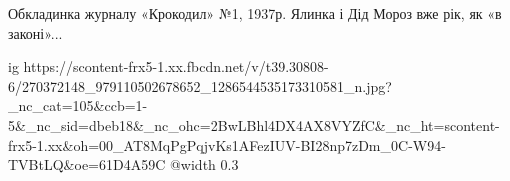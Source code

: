  
 
 
 
 
Обкладинка журналу «Крокодил» №1, 1937р. Ялинка і Дід Мороз вже рік, як «в законі»...

\ifcmt
  ig https://scontent-frx5-1.xx.fbcdn.net/v/t39.30808-6/270372148_979110502678652_1286544535173310581_n.jpg?_nc_cat=105&ccb=1-5&_nc_sid=dbeb18&_nc_ohc=2BwLBhl4DX4AX8VYZfC&_nc_ht=scontent-frx5-1.xx&oh=00_AT8MqPgPqjvKs1AFezIUV-BI28np7zDm_0C-W94-TVBtLQ&oe=61D4A59C
  @width 0.3
\fi
